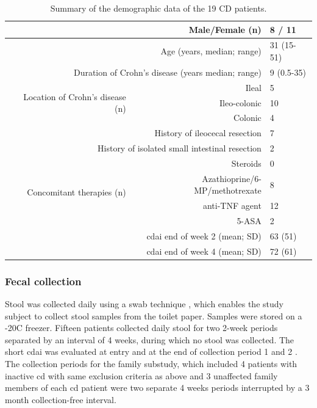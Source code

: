 \begin{table}[htbp]
    \centering
    \caption{Summary of the demographic data of the 19 CD patients.}
    \label{id-tabMethods}
    \begin{tabular}{rrl}
    \toprule
         \multicolumn{2}{r}{Male/Female (n)} &	8 / 11\\
    \midrule
    \multicolumn{2}{r}{Age (years, median; range)} &	31 (15-51)\\
\midrule
\multicolumn{2}{r}{Duration of Crohn's disease (years median; range)} &	9 (0.5-35)\\
\midrule
\multirow{3}{*}{Location of Crohn's disease (n)} & 	Ileal & 5\\
 &   	Ileo-colonic & 10\\
 &     	Colonic	 & 4\\
\midrule
\multicolumn{2}{r}{History of ileocecal resection} &	7\\
\midrule
\multicolumn{2}{r}{History of isolated small intestinal resection} &	2\\
\midrule
\multirow{4}{*}{Concomitant therapies (n)} &        	Steroids & 0\\
&        	Azathioprine/6-MP/methotrexate & 8\\
 &        	anti-TNF agent & 12\\
     &   	5-ASA	 &2\\
\midrule
\multicolumn{2}{r}{\gls{cdai} end of week 2 (mean; SD)} &	63 (51)\\
\midrule
\multicolumn{2}{r}{\gls{cdai} end of week 4 (mean; SD)} &	72 (61)\\
\bottomrule
    \end{tabular}
\end{table}

\subsubsection{Fecal collection}

Stool was collected daily using a swab technique \cite{RN4220}, which enables the study subject to collect stool samples from the toilet paper. Samples were stored on a -20\textdegree C freezer. Fifteen patients collected daily stool for two 2-week periods separated by an interval of 4 weeks, during which no stool was collected.  The short \gls{cdai} was evaluated at entry and at the end of collection period 1 and 2 \cite{RN4006}. The collection periods for the family substudy, which included 4 patients with inactive \gls{cd} with same exclusion criteria as above and 3 unaffected family members of each \gls{cd} patient were two separate 4 weeks periods interrupted by a 3 month collection-free interval.

